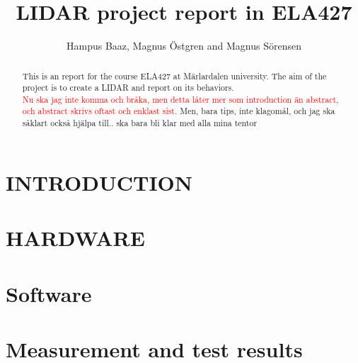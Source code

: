 

\title{\LARGE \bf
LIDAR project report in ELA427}
\author{Hampus Baaz, Magnus \"{O}stgren and Magnus S\"{o}rensen }


\maketitle
\thispagestyle{empty}
\pagestyle{empty}

\begin{abstract}
This is an report for the course ELA427 at M\"{a}rlardalen university. The aim of the project is to create a LIDAR and report on its behaviors.\\
\textcolor{red}{Nu ska jag inte komma och bråka, men detta låter mer som introduction än abstract, och abstract skrivs oftast och enklast sist.} Men, bara tips, inte klagomål, och jag ska såklart också hjälpa till.. ska bara bli klar med alla mina tentor 
\end{abstract}


\section{INTRODUCTION}




\section{HARDWARE}


\section{Software}
%
\section{Measurement and test results}
%

